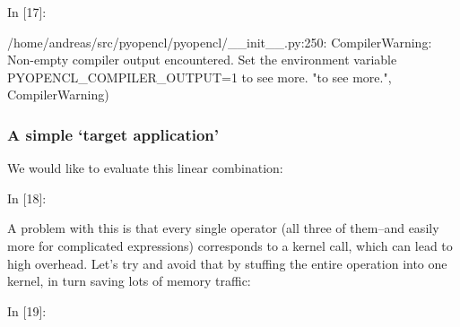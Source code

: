     \begin{BGVerbatim}[commandchars=\\\{\}]
{\color{incolor}In [{\color{incolor}17}]:}   
             
             
\end{BGVerbatim}

    \begin{BGVerbatim}[commandchars=\\\{\}]
/home/andreas/src/pyopencl/pyopencl/\_\_init\_\_.py:250: CompilerWarning: Non-empty compiler output encountered. Set the environment variable PYOPENCL\_COMPILER\_OUTPUT=1 to see more.
  "to see more.", CompilerWarning)

    \end{BGVerbatim}

    \hypertarget{a-simple-target-application}{%
\subsubsection{A simple `target
application'}\label{a-simple-target-application}}

    We would like to evaluate this linear combination:

    \begin{BGVerbatim}[commandchars=\\\{\}]
{\color{incolor}In [{\color{incolor}18}]:}     
\end{BGVerbatim}

    A problem with this is that every single operator (all three of
them--and easily more for complicated expressions) corresponds to a
kernel call, which can lead to high overhead. Let's try and avoid that
by stuffing the entire operation into one kernel, in turn saving lots of
memory traffic:

    \begin{BGVerbatim}[commandchars=\\\{\}]
{\color{incolor}In [{\color{incolor}19}]:}    
\end{BGVerbatim}

